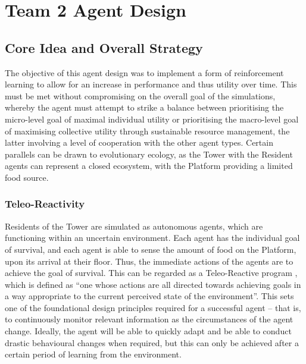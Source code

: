 \chapter{Team 2 Agent Design}\label{team_2_agent_design}


\section{Core Idea and Overall Strategy}
The objective of this agent design was to implement a form of reinforcement learning to allow for an increase in performance and thus utility over time. This must be met without compromising on the overall goal of the simulations, whereby the agent must attempt to strike a balance between prioritising the micro-level goal of maximal individual utility or prioritising the macro-level goal of maximising collective utility through sustainable resource management, the latter involving a level of cooperation with the other agent types. Certain parallels can be drawn to evolutionary ecology, as the Tower with the Resident agents can represent a closed ecosystem, with the Platform providing a limited food source.
\subsection{Teleo-Reactivity}
Residents of the Tower are simulated as autonomous agents, which are functioning within an uncertain environment. Each agent has the individual goal of survival, and each agent is able to sense the amount of food on the Platform, upon its arrival at their floor. Thus, the immediate actions of the agents are to achieve the goal of survival. This can be regarded as a Teleo-Reactive program \cite{NilssonN1994TPfA}, which is defined as “one whose actions are all directed towards achieving goals in a way appropriate to the current perceived state of the environment”. This sets one of the foundational design principles required for a successful agent – that is, to continuously monitor relevant information as the circumstances of the agent change. Ideally, the agent will be able to quickly adapt and be able to conduct drastic behavioural changes when required, but this can only be achieved after a certain period of learning from the environment. 
